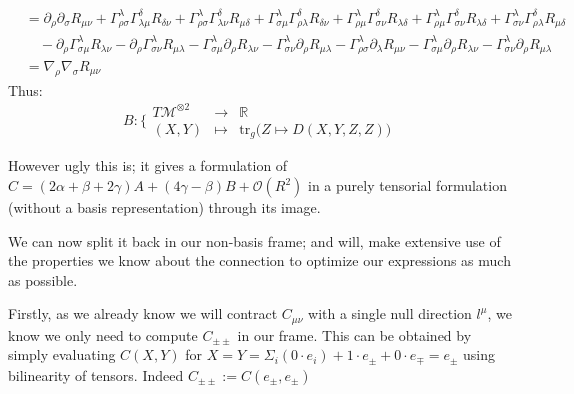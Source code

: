 \documentclass[a4paper,11pt]{article}
\numberwithin{equation}{section}
\theoremstyle{definition}
\begin{document}
\begin{align*}
    &= \partial_\rho\partial_\sigma R_{\mu\nu}
    + \Gamma_{\rho\sigma}^\lambda \Gamma_{\lambda\mu}^\delta R_{\delta\nu}
    + \Gamma_{\rho\sigma}^\lambda \Gamma_{\lambda\nu}^\delta R_{\mu\delta}
    + \Gamma_{\sigma\mu}^\lambda\Gamma_{\rho\lambda}^\delta R_{\delta\nu}
    + \Gamma_{\rho\mu}^\lambda\Gamma_{\sigma\nu}^\delta R_{\lambda\delta}
    + \Gamma_{\rho\mu}^\lambda\Gamma_{\sigma\nu}^\delta R_{\lambda\delta}
    + \Gamma_{\sigma\nu}^\lambda \Gamma_{\rho\lambda}^\delta R_{\mu\delta}\\
    &\quad - \partial_\rho \Gamma_{\sigma\mu}^\lambda R_{\lambda\nu}
    - \partial_\rho \Gamma_{\sigma\nu}^\lambda R_{\mu\lambda}
    - \Gamma_{\sigma\mu}^\lambda \partial_\rho R_{\lambda\nu}
    - \Gamma_{\sigma\nu}^\lambda \partial_\rho R_{\mu\lambda}
    - \Gamma_{\rho\sigma}^\lambda \partial_\lambda R_{\mu\nu}
    - \Gamma_{\sigma\mu}^\lambda \partial_\rho R_{\lambda\nu}
    - \Gamma_{\sigma\nu}^\lambda \partial_\rho R_{\mu\lambda}\\
    &= \nabla_\rho \nabla_\sigma R_{\mu\nu}
\end{align*}
Thus:
\begin{equation}
    B:\bigg\{ \begin{matrix}
        T\mathcal{M}^{\otimes 2} & \to & \mathbb{R}\\
        (X,Y) & \mapsto & \mathrm{tr}_g \big(Z \mapsto D(X,Y,Z,Z)\big)
    \end{matrix}
\end{equation}

However ugly this is; it gives a formulation of $C=(2\alpha + \beta + 2\gamma) A +(4\gamma- \beta) B + \mathcal{O}(R^2)$ in a purely tensorial formulation (without a basis representation) through its image.

We can now split it back in our non-basis frame; and will, make extensive use of the properties we know about the connection to optimize our expressions as much as possible.

Firstly, as we already know we will contract $C_{\mu\nu}$ with a single null direction $l^\mu$, we know we only need to compute $C_{\pm\pm}$ in our frame.
This can be obtained by simply evaluating $C(X,Y)$ for $X=Y=\Sigma_i(0\cdot e_i) + 1 \cdot e_\pm + 0 \cdot e_\mp = e_\pm$ using bilinearity of tensors. Indeed $C_{\pm\pm}:=C(e_\pm,e_\pm)$
\end{document}
